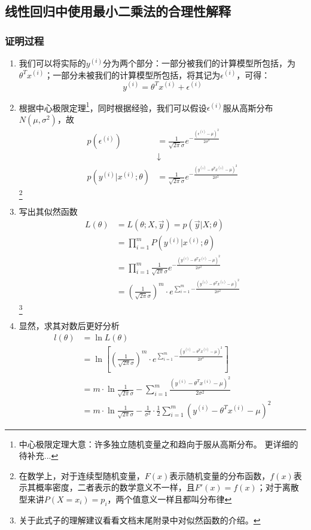 \subsection{线性回归中使用最小二乘法的合理性解释}
\subsubsection{证明过程}
\begin{enumerate}
	\item 我们可以将实际的$y^{(i)}$分为两个部分：一部分被我们的计算模型所包括，为$\theta^Tx^{(i)}$；一部分未被我们的计算模型所包括，将其记为$\epsilon^{(i)}$，可得：
	\begin{equation}
		y^{(i)} = \theta^Tx^{(i)} + \epsilon^{(i)}
	\end{equation}

	\item 根据中心极限定理\footnote{中心极限定理大意：许多独立随机变量之和趋向于服从高斯分布。 更详细的待补充...}，同时根据经验，我们可以假设$\epsilon^{(i)}$服从高斯分布$N(\mu, \sigma^2)$，故
	\begin{align}
		p(\epsilon^{(i)}) &= \frac{1}{\sqrt{2\pi}\sigma}e^{-\frac{\left(\epsilon^{(i)}-\mu\right)^2}{2\sigma^2}}  \\
		&\downarrow \\
		p(y^{(i)}|x^{(i)};\theta) &= \frac{1}{\sqrt{2\pi}\sigma}e^{-\frac{\left(y^{(i)}-\theta^Tx^{(i)}-\mu\right)^2}{2\sigma^2}}
	\end{align}
	\footnote{在数学上，对于连续型随机变量，$F(x)$表示随机变量的分布函数，$f(x)$表示其概率密度，二者表示的数学意义不一样，且$F'(x) = f(x)$；对于离散型来讲$P(X=x_i)=p_i$，两个值意义一样且都叫分布律}

	\item 写出其似然函数
	\begin{align}
		L(\theta) &= L(\theta; X, \vec{y}) = p(\vec{y}|X; \theta) \\
		&= \prod_{i=1}^{m}P(y^{(i)}|x^{(i)}; \theta) \\
		&= \prod_{i=1}^{m}\frac{1}{\sqrt{2\pi}\sigma}e^{-\frac{\left(y^{(i)}-\theta^Tx^{(i)}-\mu\right)^2}{2\sigma^2}} \\
		&= \left(\frac{1}{\sqrt{2\pi}\sigma}\right)^m\cdot e^{\sum_{i=1}^{m}{-\frac{\left(y^{(i)}-\theta^Tx^{(i)}-\mu\right)^2}{2\sigma^2}}}
	\end{align}
	\footnote{关于此式子的理解建议看看文档末尾附录中对似然函数的介绍。}

	\item 显然，求其对数后更好分析
	\begin{align}
		l(\theta) &= \ln{L(\theta)} \\
		&= \ln\left[\left(\frac{1}{\sqrt{2\pi}\sigma}\right)^m\cdot e^{\sum_{i=1}^{m}{-\frac{\left(y^{(i)}-\theta^Tx^{(i)}-\mu\right)^2}{2\sigma^2}}}\right] \\
		&= m\cdot\ln\frac{1}{\sqrt{2\pi}\sigma} - \sum_{i=1}^{m}\frac{\left(y^{(i)}-\theta^Tx^{(i)}-\mu\right)^2}{2\sigma^2} \\
		&= m\cdot\ln\frac{1}{\sqrt{2\pi}\sigma} - \frac{1}{{\sigma^2}}\cdot \frac{1}{2} \sum_{i=1}^{m}\left(y^{(i)}-\theta^Tx^{(i)}-\mu\right)^2
	\end{align}


\end{enumerate}
